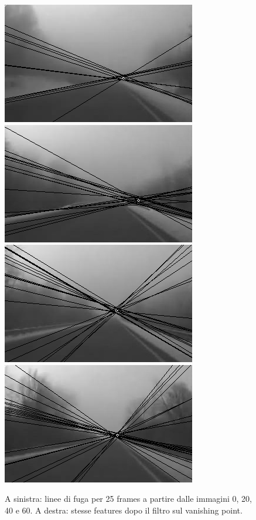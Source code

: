 \documentclass[12pt]{report}
\begin{document}
\begin{figure}[H]
\begin{minipage}[c]{0.5\linewidth}
	\centering
	\includegraphics[scale=\imTrackScale]{images/aF_0000_25.png}
	\includegraphics[scale=\imTrackScale]{images/aF_0020_25.png}
	\includegraphics[scale=\imTrackScale]{images/aF_0040_25.png}
	\includegraphics[scale=\imTrackScale]{images/aF_0060_25.png}
\end{minipage}
\caption[short]{A sinistra: linee di fuga per 25 frames a partire dalle immagini 0, 20, 40 e 60. A destra: stesse features dopo il filtro sul vanishing point.}
\label{fig:vp25}
\end{figure}
\end{document}
